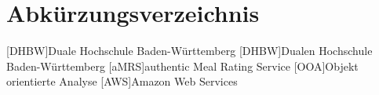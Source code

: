 \section*{Abkürzungsverzeichnis}
\begin{acronym}
  [DHBW]{Duale Hochschule Ba\-den-\-Würt\-tem\-berg}
  [DHBW]{Dualen Hochschule Ba\-den-\-Würt\-tem\-berg}
  [aMRS]{authentic Meal Rating Service}
  [OOA]{Objekt orientierte Analyse}
  [AWS]{Amazon Web Services}
\end{acronym}
\newpage